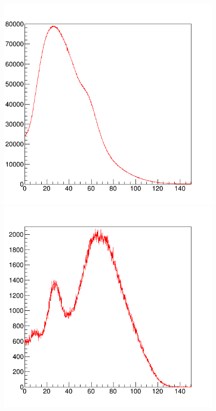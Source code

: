 \begin{figure}[H]
 \begin{minipage}{0.5\hsize}
  \begin{center}
 \includegraphics[bb=0.000000 0.000000 596.000000 574.000000,width=1\hsize]{image2/chapter5/all_energy.png} 
  \end{center}
 \end{minipage}
 \begin{minipage}{0.5\hsize}
  \begin{center}
 \includegraphics[bb=0.000000 0.000000 596.000000 574.000000,width=1\hsize]{image2/chapter5/I_kedge_100sec.png} 

\end{center}
\end{minipage}
\end{figure}
